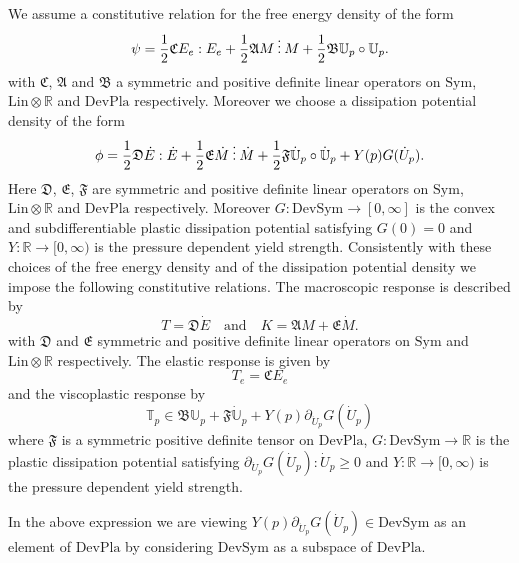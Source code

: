 We assume a constitutive relation for the free energy density of the form
\[
\psi=\frac{1}{2}\mathfrak{C}E_e:E_e+\frac{1}{2}\mathfrak{A}M\mathbin{\vdots} M+\frac{1}{2}\mathfrak{B}\mathbb{U}_p\circ\mathbb{U}_p.
\]
with $\mathfrak{C}$, $\mathfrak{A}$ and $\mathfrak{B}$ a symmetric and positive definite linear operators on $\text{Sym}$, $\text{Lin}\otimes\mathbb{R}$ and $\text{DevPla}$ respectively. Moreover we choose a dissipation potential density of the form
\[
\phi=\frac{1}{2}\mathfrak{D}\dot E:\dot E+\frac{1}{2}\mathfrak{E}\dot M\mathbin{\vdots}\dot M+\frac{1}{2}\mathfrak{F}\dot{\mathbb{U}}_p\circ\dot{\mathbb{U}}_p+Y(p)G(\dot U_p).
\]
Here $\mathfrak{D}$, $\mathfrak{E}$, $\mathfrak{F}$ are symmetric and positive definite linear operators on $\text{Sym}$, $\text{Lin}\otimes\mathbb{R}$ and $\text{DevPla}$ respectively. Moreover $G\colon\text{DevSym}\to[0,\infty]$ is the convex and subdifferentiable plastic dissipation potential satisfying $G(0)=0$ and $Y\colon\mathbb{R}\to[0,\infty)$ is the pressure dependent yield strength.
Consistently with these choices of the free energy density and of the dissipation potential density we impose the following constitutive relations. The macroscopic response is described by
\[
T=\mathfrak{D}\dot E\quad\text{and}\quad K=\mathfrak{A}M+\mathfrak{E}\dot M.
\]
with $\mathfrak{D}$ and $\mathfrak{E}$ symmetric and positive definite linear operators on $\text{Sym}$ and $\text{Lin}\otimes\mathbb{R}$ respectively. The elastic response is given by
\[
T_e=\mathfrak{C}E_e
\]
and the viscoplastic response by
\[
\mathbb{T}_p\in\mathfrak{B}\mathbb{U}_p+\mathfrak{F}\dot{\mathbb{U}}_p+Y(p)\partial_{\dot U_p}G(\dot U_p)
\]
where $\mathfrak{F}$ is a symmetric positive definite tensor on $\text{DevPla}$, $G\colon\text{DevSym}\to\mathbb{R}$ is the plastic dissipation potential satisfying $\partial_{\dot U_p}G(\dot U_p):\dot U_p\ge0$ and $Y\colon\mathbb{R}\to[0,\infty)$ is the pressure dependent yield strength.
\begin{rmk}
In the above expression we are viewing $Y(p)\partial_{\dot U_p}G(\dot U_p)\in\text{DevSym}$ as an element of $\text{DevPla}$ by considering $\text{DevSym}$ as a subspace of $\text{DevPla}$.
\end{rmk}
